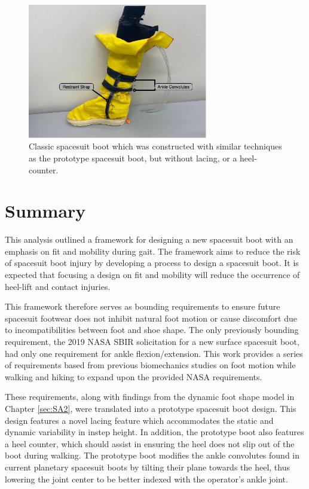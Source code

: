 \documentclass[defaultstyle,11pt]{comps}
\begin{document}
\begin{figure}
\hypertarget{fig:SA3-classic_boot}{%
\centering
\includegraphics[width=0.7\textwidth,height=\textheight]{../fig/SA3/Classic_Spaceboot.png}
\caption{Classic spacesuit boot which was constructed with similar techniques as the prototype spacesuit boot, but without lacing, or a heel-counter.}\label{fig:SA3-classic_boot}
}
\end{figure}

\hypertarget{summary-5}{%
\section{Summary}\label{summary-5}}

This analysis outlined a framework for designing a new spacesuit boot with an emphasis on fit and mobility during gait.
The framework aims to reduce the risk of spacesuit boot injury by developing a process to design a spacesuit boot.
It is expected that focusing a design on fit and mobility will reduce the occurrence of heel-lift and contact injuries.

This framework therefore serves as bounding requirements to ensure future spacesuit footwear does not inhibit natural foot motion or cause discomfort due to incompatibilities between foot and shoe shape.
The only previously bounding requirement, the 2019 NASA SBIR solicitation for a new surface spacesuit boot, had only one requirement for ankle flexion/extension.
This work provides a series of requirements based from previous biomechanics studies on foot motion while walking and hiking to expand upon the provided NASA requirements.

These requirements, along with findings from the dynamic foot shape model in Chapter \ref{sec:SA2}, were translated into a prototype spacesuit boot design.
This design features a novel lacing feature which accommodates the static and dynamic variability in instep height.
In addition, the prototype boot also features a heel counter, which should assist in ensuring the heel does not slip out of the boot during walking.
The prototype boot modifies the ankle convolutes found in current planetary spacesuit boots by tilting their plane towards the heel, thus lowering the joint center to be better indexed with the operator's ankle joint.
\end{document}
